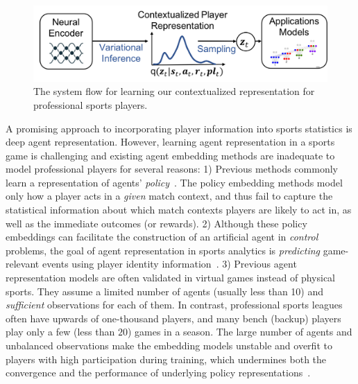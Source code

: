 \documentclass[letterpaper]{article} %
\begin{document}
\begin{figure}[t!]
    \centering
    \includegraphics[width=1\columnwidth]{figures/flow-chart.png}
    \caption{The system flow for learning our contextualized representation for professional sports players.}
    \label{fig:player-embedding-example}
    \vspace{-0.2in}
\end{figure}
A promising approach to incorporating player information into sports statistics is deep agent representation.
However, learning agent representation in a sports game is challenging and existing agent embedding methods are inadequate to model professional players for several reasons: {1)}
Previous methods commonly learn a representation of agents’ {\em policy}~\cite{GroverRepresent18,ChandakAction19,Chen2019ActionEmbedding}. 
The policy embedding methods model only how a player acts in a {\em given} match context, and thus fail to capture the statistical information about which match contexts players are likely to act in, as well as the immediate outcomes (or rewards).
{2)} Although these policy embeddings can facilitate  the construction of an artificial agent in {\it control} problems, 
the goal of agent representation in sports analytics is {\em predicting} game-relevant events using player identity information~\cite{ganguly2018problem,schwartz,Schumaker2010SportStats}.
{3)} Previous agent representation models are often validated in virtual games instead of physical sports. They assume a limited number of agents (usually less than 10) and {\it sufficient} observations for each of them. In contrast, professional sports leagues often have upwards of one-thousand players, and many  bench (backup) players play only a few (less than $20$) games
in a season.
The large number of agents and unbalanced observations make the embedding models unstable and overfit to players with high participation during training, which undermines both the convergence and the performance of underlying policy representations~\cite{AlbrechtSurvey18}.
\end{document}
